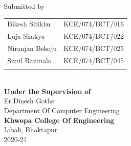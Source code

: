 \begin{center}
		\vspace{0.5in}
		\large{Submitted by}\\
		\begin{tabular}{p{3.5in}p{3in}}
			\hspace{0.3cm}Bikesh Sitikhu & KCE/074/BCT/016\\
			\hspace{0.3cm}Luja Shakya & KCE/074/BCT/022\\
			\hspace{0.3cm}Niranjan Bekoju & KCE/074/BCT/025\\
			\hspace{0.3cm}Sunil Banmala & KCE/074/BCT/045\\
		 \vspace{0.2in}
		\end{tabular}
		\\
		\vspace{0.1in}
		\large{\textbf{Under the Supervision of}\\}
			\normalsize{Er.Dinesh Gothe\\
				Department Of Computer Engineering\\
			}
			\vspace{0.2in}
		\large{\textbf{Khwopa College Of Engineering}\\}
			\normalsize{Libali, Bhaktapur\\
			2020-21
		}
    \end{center}
